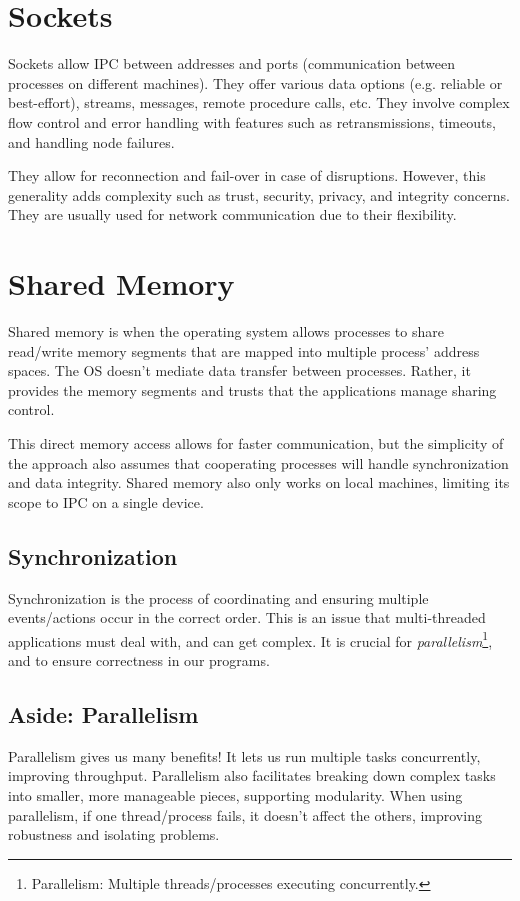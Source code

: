\documentclass{report}
\begin{document}
\section{Sockets}
Sockets allow IPC between addresses and ports (communication between processes on different
machines). They offer various data options (e.g. reliable or best-effort), streams, messages, remote
procedure calls, etc. They involve complex flow control and error handling with features such as
retransmissions, timeouts, and handling node failures. 

They allow for reconnection and fail-over in case of disruptions. However, this generality adds
complexity such as trust, security, privacy, and integrity concerns. They are usually used for
network communication due to their flexibility.


\section{Shared Memory}
Shared memory is when the operating system allows processes to share read/write memory segments that
are mapped into multiple process' address spaces. The OS doesn't mediate data transfer between
processes. Rather, it provides the memory segments and trusts that the applications manage sharing
control.

This direct memory access allows for faster communication, but the simplicity of the approach also
assumes that cooperating processes will handle synchronization and data integrity. Shared memory
also only works on local machines, limiting its scope to IPC on a single device.


\subsection{Synchronization}
Synchronization is the process of coordinating and ensuring multiple events/actions occur in the
correct order. This is an issue that multi-threaded applications must deal with, and can get
complex. It is crucial for \textit{parallelism}\footnote{Parallelism: Multiple threads/processes executing
  concurrently.}, and to ensure correctness in our programs. 


\subsection*{Aside: Parallelism}
Parallelism gives us many benefits! It lets us run multiple tasks concurrently, improving
throughput. Parallelism also facilitates breaking down complex tasks into smaller, more manageable
pieces, supporting modularity. When using parallelism, if one thread/process fails, it doesn't
affect the others, improving robustness and isolating problems.
\end{document}
